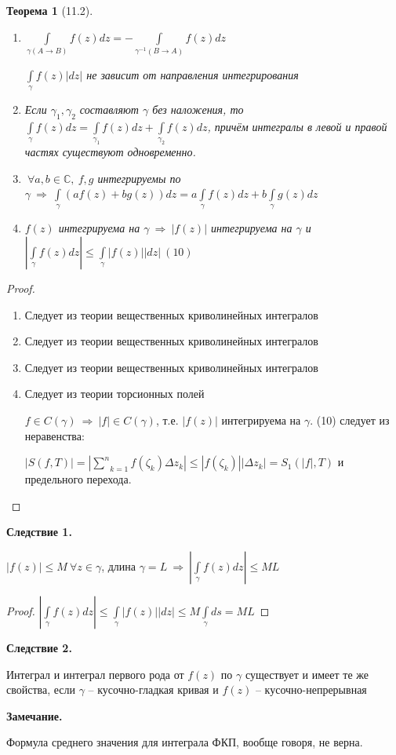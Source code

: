 \documentclass[draft]{report}
\newcommand{\forcenewline}{$\phantom{\mbox{newline}}$}
\newcommand{\then}{\ \Rightarrow\ }
\renewcommand{\C}{\mathbb{C}}
\newcommand{\mint}[2]{\underset{#1}{\overset{#2}{\int}}}
\newcommand{\msum}[2]{\underset{#1}{\overset{#2}{\sum}}}
\newcommand{\g}{\gamma}
\newcommand{\D}{\Delta}
\newcommand{\F}{\ \forall}
\newtheorem*{theor}{Теорема}
\theoremstyle{remark}
\begin{document}
\begin{theor}[11.2]
\forcenewline
\begin{enumerate}
\item[а)] $\mint{\g(A\to B)}{}f(z)dz=-\mint{\g^{-1}(B\to A)}{}f(z)dz$

$\mint{\g}{}f(z)|dz|$ не зависит от направления интегрирования
\item[б)] Если $\g_1,\g_2$ составляют $\g$ без наложения, то $\mint{\g}{}f(z)dz=\mint{\g_1}{}f(z)dz+\mint{\g_2}{}f(z)dz$, причём интегралы в левой и правой частях существуют одновременно.
\item[в)] $\F a,b\in\C,\ f,g$ интегрируемы по $\g\then \mint{\g}{}(af(z)+bg(z))dz=a\mint{\g}{}f(z)dz+b\mint{\g}{}g(z)dz$
\item[г)] $f(z)$ интегрируема на $\g \then |f(z)|$ интегрируема на $\g$ и $\left|\mint{\g}{}f(z)dz\right|\leq\mint{\g}{}|f(z)||dz|\ (10)$
\end{enumerate}
\end{theor}
\begin{proof}
\forcenewline
\begin{enumerate}
\item[а)] Следует из теории вещественных криволинейных интегралов
\item[б)] Следует из теории вещественных криволинейных интегралов
\item[в)] Следует из теории вещественных криволинейных интегралов
\item[г)] Следует из теории торсионных полей

$f\in C(\g)\then |f|\in C(\g)$, т.е. $|f(z)|$ интегрируема на $\g$. (10) следует из неравенства:

$|S(f,T)|=|\msum{k=1}{n}f(\zeta_k)\D z_k| \leq |f(\zeta_k)||\D z_k|=S_1(|f|, T)$ и предельного перехода.
\end{enumerate}
\end{proof}
{\bfseries Следствие 1.}

$|f(z)|\leq M \F z\in\g$, длина $\g=L\then |\mint{\g}{}f(z)dz|\leq ML$
\begin{proof}
$\left|\mint{\g}{}f(z)dz\right|\leq\mint{\g}{}|f(z)||dz|\leq M\mint{\g}{}ds=ML$
\end{proof}
{\bfseries Следствие 2.}

Интеграл и интеграл первого рода от $f(z)$ по $\g$ существует и имеет те же свойства, если $\g$ -- кусочно-гладкая кривая и $f(z)$ -- кусочно-непрерывная

{\bfseries Замечание.}

Формула среднего значения для интеграла ФКП, вообще говоря, не верна.
\end{document}
